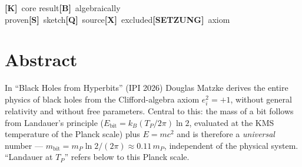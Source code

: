 
\providecommand{\K}{}\renewcommand{\K}{\textbf{[K]}}
\providecommand{\B}{}\renewcommand{\B}{\textbf{[B]}}
\renewcommand{\S}{\textbf{[S]}}
\providecommand{\Q}{}\renewcommand{\Q}{\textbf{[Q]}}
\providecommand{\X}{}\renewcommand{\X}{\textbf{[X]}}
\providecommand{\SETZ}{}\renewcommand{\SETZ}{\textbf{[SETZUNG]}}
\providecommand{\lP}{}\renewcommand{\lP}{\ell_{\mathrm{P}}}
\providecommand{\mP}{}\renewcommand{\mP}{m_{\mathrm{P}}}
\providecommand{\TP}{}\renewcommand{\TP}{T_{\mathrm{P}}}
\renewcommand{\TH}{T_{\mathrm{H}}}
\providecommand{\rs}{}\renewcommand{\rs}{r_{\mathrm{s}}}
\providecommand{\SBH}{}\renewcommand{\SBH}{S_{\mathrm{BH}}}
\providecommand{\xig}{}\renewcommand{\xig}{\xi}
\providecommand{\Tmass}{}\renewcommand{\Tmass}{\tilde{T}}
\providecommand{\Ebit}{}\renewcommand{\Ebit}{E_{\mathrm{bit}}}

\begin{tcolorbox}[ffgftbox, title={Legend}]
  \K\ core result\quad \B\ algebraically proven\quad \S\ sketch\quad \Q\ source\quad \X\ excluded\quad \SETZ\ axiom
\end{tcolorbox}

\section*{Abstract}

In \enquote{Black Holes from Hyperbits} (IPI 2026) Douglas Matzke derives
the entire physics of black holes from the Clifford-algebra axiom
$e_i^2 = +1$, without general relativity and without free parameters.
Central to this: the mass of a bit follows from Landauer's principle
($E_{\mathrm{bit}} = k_B (T_P/2\pi) \ln 2$, evaluated at the KMS temperature of the Planck scale) plus $E = mc^2$ and is therefore a
\emph{universal} number — $m_{\mathrm{bit}} = m_P \ln 2/(2\pi) \approx 0.11\,m_P$,
independent of the physical system.
``Landauer at $T_P$'' refers below to this Planck scale.

